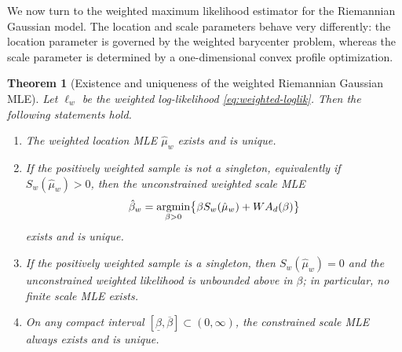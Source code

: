 \documentclass[11pt]{article}
\newtheorem{theorem}{Theorem}[section]
\begin{document}
We now turn to the weighted maximum likelihood estimator for the Riemannian Gaussian model. The location and scale parameters behave very differently: the location parameter is governed by the weighted barycenter problem, whereas the scale parameter is determined by a one-dimensional convex profile optimization.

\begin{theorem}[Existence and uniqueness of the weighted Riemannian Gaussian MLE]\label{thm:single-mle}
Let \(\ell_w\) be the weighted log-likelihood \eqref{eq:weighted-loglik}. Then the following statements hold.
\begin{enumerate}[label=(\roman*)]
    \item The weighted location MLE \(\hat{\mu}_w\) exists and is unique.
    \item If the positively weighted sample is not a singleton, equivalently if \(S_w(\hat{\mu}_w)>0\), then the unconstrained weighted scale MLE
    \[
    \hat{\beta}_w
    =
    \operatorname*{argmin}_{\beta>0}
    \bigl\{
    \beta S_w(\hat{\mu}_w)+W A_d(\beta)
    \bigr\}
    \]
    exists and is unique.
    \item If the positively weighted sample is a singleton, then \(S_w(\hat{\mu}_w)=0\) and the unconstrained weighted likelihood is unbounded above in \(\beta\); in particular, no finite scale MLE exists.
    \item On any compact interval \([\underline{\beta},\overline{\beta}]\subset(0,\infty)\), the constrained scale MLE always exists and is unique.
\end{enumerate}
\end{theorem}
\end{document}
